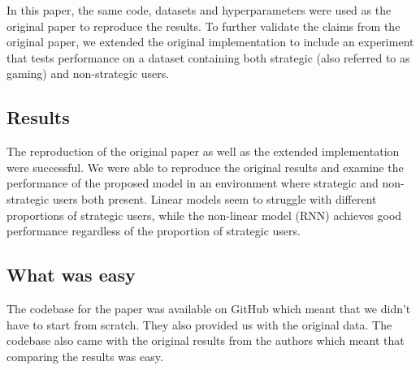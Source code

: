 In this paper, the same code, datasets and hyperparameters were used as the original paper to reproduce the results.
To further validate the claims from the original paper, we extended the original implementation to include an experiment that tests performance on a dataset containing both strategic (also referred to as gaming) and non-strategic users.

\subsection*{Results}
The reproduction of the original paper as well as the extended implementation were successful. We were able to reproduce the original results and examine the performance of the proposed model in an environment where strategic and non-strategic users both present. Linear models seem to struggle with different proportions of strategic users, while the non-linear model (RNN) achieves good performance regardless of the proportion of strategic users.
\subsection*{What was easy}


The codebase for the paper was available on GitHub which meant that we didn't have to start from scratch. They also provided us with the original data. The codebase also came with the original results from the authors which meant that comparing the results was easy.


